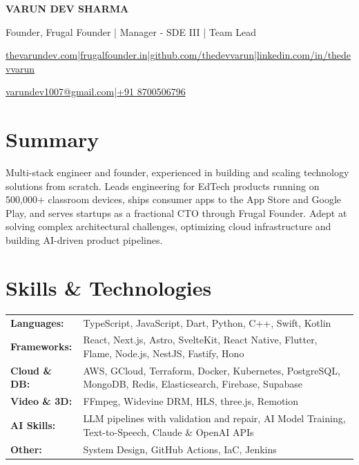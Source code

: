 \documentclass[10pt,a4paper]{article}
\newcommand{\lk}[2]{\href{#1}{\color{link}#2}}
\newcommand{\sep}{\hspace{11pt}|\hspace{11pt}}
\renewcommand{\b}[1]{\textbf{#1}}
\begin{document}
\small

\begin{center}
{\LARGE\bfseries\color{navy}VARUN DEV SHARMA}\par\vspace{2.5pt}
{\normalsize\color{slate}Founder, Frugal Founder | Manager - SDE III | Team Lead}\par\vspace{5.5pt}
\lk{https://thevarundev.com}{thevarundev.com}\sep\lk{https://www.frugalfounder.in}{frugalfounder.in}\sep\lk{https://github.com/thedevvarun}{github.com/thedevvarun}\sep\lk{https://www.linkedin.com/in/thedevvarun/}{linkedin.com/in/thedevvarun}\par\vspace{3pt}
\lk{mailto:varundev1007@gmail.com}{varundev1007@gmail.com}\sep\lk{tel:+918700506796}{+91 8700506796}\par
\end{center}
\vspace{-7pt}

\section{Summary}
Multi-stack engineer and founder, experienced in building and scaling technology solutions from scratch. Leads engineering for EdTech products running on 500,000+ classroom devices, ships consumer apps to the App Store and Google Play, and serves startups as a fractional CTO through Frugal Founder. Adept at solving complex architectural challenges, optimizing cloud infrastructure and building AI-driven product pipelines.

\section{Skills \& Technologies}
\begin{tabular}{@{}p{72.2pt}@{}p{451pt}@{}}
\b{Languages:} & TypeScript, JavaScript, Dart, Python, C++, Swift, Kotlin \\
\b{Frameworks:} & React, Next.js, Astro, SvelteKit, React Native, Flutter, Flame, Node.js, NestJS, Fastify, Hono \\
\b{Cloud \& DB:} & AWS, GCloud, Terraform, Docker, Kubernetes, PostgreSQL, MongoDB, Redis, Elasticsearch, Firebase, Supabase \\
\b{Video \& 3D:} & FFmpeg, Widevine DRM, HLS, three.js, Remotion \\
\b{AI Skills:} & LLM pipelines with validation and repair, AI Model Training, Text-to-Speech, Claude \& OpenAI APIs \\
\b{Other:} & System Design, GitHub Actions, IaC, Jenkins \\
\end{tabular}
\end{document}
